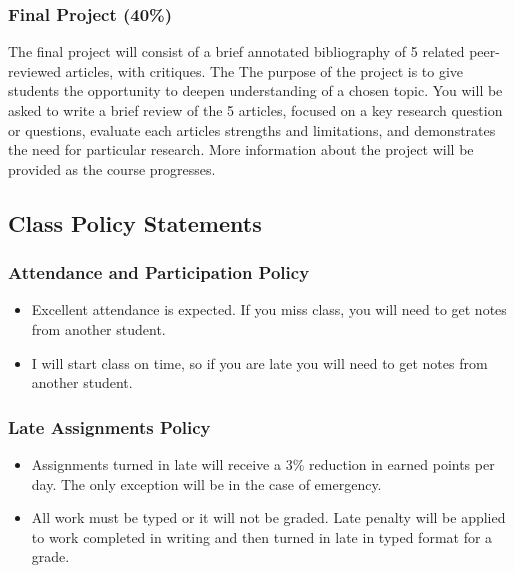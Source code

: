 \documentclass[11pt,]{article}
\providecommand{\tightlist}{%
  \setlength{\itemsep}{0pt}\setlength{\parskip}{0pt}}
\begin{document}
\hypertarget{final-project-40}{%
\subsubsection{Final Project (40\%)}\label{final-project-40}}

The final project will consist of a brief annotated bibliography of 5
related peer-reviewed articles, with critiques. The The purpose of the
project is to give students the opportunity to deepen understanding of a
chosen topic. You will be asked to write a brief review of the 5
articles, focused on a key research question or questions, evaluate each
articles strengths and limitations, and demonstrates the need for
particular research. More information about the project will be provided
as the course progresses.

\hypertarget{class-policy-statements}{%
\subsection{Class Policy Statements}\label{class-policy-statements}}

\hypertarget{attendance-and-participation-policy}{%
\subsubsection{Attendance and Participation
Policy}\label{attendance-and-participation-policy}}

\begin{itemize}
\tightlist
\item
  Excellent attendance is expected. If you miss class, you will need to
  get notes from another student.
\item
  I will start class on time, so if you are late you will need to get
  notes from another student.
\end{itemize}

\hypertarget{late-assignments-policy}{%
\subsubsection{Late Assignments Policy}\label{late-assignments-policy}}

\begin{itemize}
\tightlist
\item
  Assignments turned in late will receive a 3\% reduction in earned
  points per day. The only exception will be in the case of emergency.
\item
  All work must be typed or it will not be graded. Late penalty will be
  applied to work completed in writing and then turned in late in typed
  format for a grade.
\end{itemize}
\end{document}
